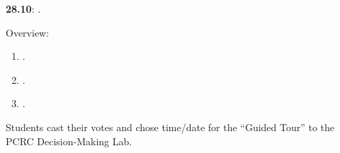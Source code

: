 \documentclass[letterpaper]{article}
\renewenvironment{itemize}{
  \begin{list}{}{
    \setlength{\leftmargin}{1.5em}
  }
}{
  \end{list}
}
\begin{document}
\begin{enumerate}

\item {\bf 28.10}: {\color{ForestGreen}{\bf Causal Inference in Social Science}}.

      \begin{itemize} 

        \item[$\diamond$] Overview:

        \begin{enumerate}

          \item[$\bullet$] \href{https://doi.org/10.1017/9781108991353.003}{}.



          \item[$\bullet$] \href{https://doi.org/10.1017/CBO9781107587991.003}{}.


          \item[$\bullet$] \href{https://www.jstor.org/stable/270939}{}.










        \end{enumerate}

        \item[{\color{red}$\diamond$}] {\color{red} Students cast their votes \href{https://doodle.com/meeting/participate/id/dLn6RGAa}{{}} and chose time/date for the ``Guided Tour'' to the PCRC Decision-Making Lab}.



\end{itemize}
\end{enumerate}
\end{document}
